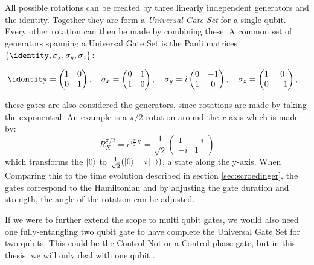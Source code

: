 All possible rotations can be created by three linearly independent generators and the identity. Together they are form a \textit{Universal Gate Set} for a single qubit. Every other rotation can then be made by combining these. A common set of generators spanning a Universal Gate Set is the Pauli matrices $\{\identity, \sigma_x, \sigma_y, \sigma_z\}$:
\begin{fullwidth}
\begin{equation}
    \identity = \begin{pmatrix}
        1 & 0 \\ 
        0 & 1
    \end{pmatrix}, \quad
    \sigma_x = \begin{pmatrix}
        0 & 1 \\ 
        1 & 0
    \end{pmatrix}, \quad
    \sigma_y = i\begin{pmatrix}
        0 & -1 \\ 
        1 & 0
    \end{pmatrix}, \quad
    \sigma_z = \begin{pmatrix}
        1 & 0 \\ 
        0 & -1
    \end{pmatrix}, \quad
\end{equation}
\end{fullwidth}
\vspace{0.15 cm}
these gates are also considered the generators, since rotations are made by taking the exponential. An example is a $\pi/2$ rotation around the $x$-axis which is made by:
\begin{equation}
    R_X^{\pi/2} = e^{i \frac{\pi}{2} \hat{X}} = \frac{1}{\sqrt{2}}\begin{pmatrix}
        1  & -i \\
        -i & 1
    \end{pmatrix} 
\end{equation}
which transforms the $\ket{0}$ to $\frac{1}{\sqrt{2}}(\ket{0} - i\ket{1})$, a state along the y-axis. When Comparing this to the time evolution described in section \ref{sec:scroedinger}, the gates correspond to the Hamiltonian and by adjusting the gate duration and strength, the angle of the rotation can be adjusted. %

If we were to further extend the scope to multi qubit gates, we would also need one fully-entangling two qubit gate to have complete the Universal Gate Set for two qubits. This could be the  Control-Not or a Control-phase gate, but in this thesis, we will only deal with one qubit \cite{krantz_quantum_2019}.


